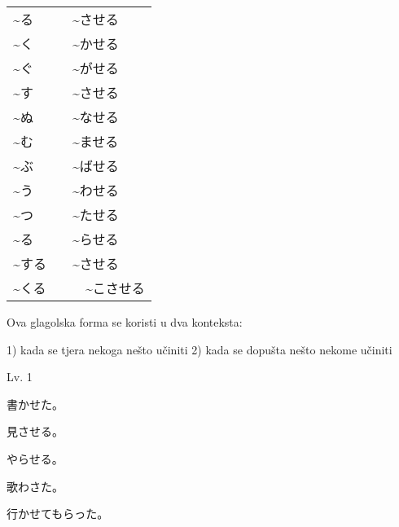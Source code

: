
\author{Tomislav Mamić}

		
	
	\begin{table}[h]
		\centering
		\begin{tabular}{l l}\toprule[2pt]
			\midrule
			\textasciitilde る & \textasciitilde させる \\
			\textasciitilde く & \textasciitilde かせる \\
			\textasciitilde ぐ & \textasciitilde がせる \\
			\textasciitilde す & \textasciitilde させる \\
			\textasciitilde ぬ & \textasciitilde なせる \\
			\textasciitilde む & \textasciitilde ませる \\
			\textasciitilde ぶ & \textasciitilde ばせる \\
			\textasciitilde う & \textasciitilde わせる \\
			\textasciitilde つ & \textasciitilde たせる \\
			\textasciitilde る & \textasciitilde らせる \\
			\textasciitilde する　& \textasciitilde させる \\
			\textasciitilde くる　&　\textasciitilde こさせる 
			\bottomrule[2pt]
		\end{tabular}
	\end{table}
	
	
	
	Ova glagolska forma se koristi u dva konteksta:

	1) kada se tjera nekoga nešto učiniti
	2) kada se dopušta nešto nekome učiniti
	
	\begin{reibun}
	\end{reibun}
	
	
	\begin{mondai}{Lv. 1}
		\item 書かせた。
		\item 見させる。
		\item やらせる。
		\item 歌わさた。
		\item 行かせてもらった。
	\end{mondai}

